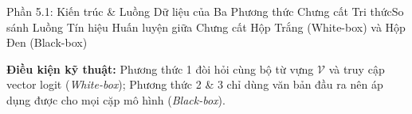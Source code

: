 \begin{frame}{Phần 5.1: Kiến trúc \& Luồng Dữ liệu của Ba Phương thức Chưng cất Tri thức}{So sánh Luồng Tín hiệu Huấn luyện giữa Chưng cất Hộp Trắng (White-box) và Hộp Đen (Black-box)}
\begin{center}
{%
    }
  \end{center}
  \vspace{0.05cm}
  \footnotesize
  \textbf{Điều kiện kỹ thuật:} Phương thức 1 đòi hỏi cùng bộ từ vựng $\mathcal{V}$ và truy cập vector logit (\textit{White-box}); Phương thức 2 \& 3 chỉ dùng văn bản đầu ra nên áp dụng được cho mọi cặp mô hình (\textit{Black-box}).
\end{frame}

